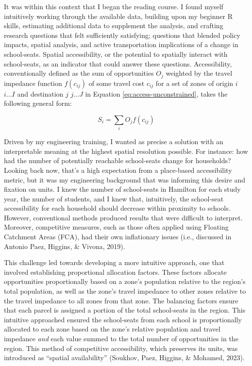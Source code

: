\documentclass[
11pt, %
oneside, %
english, %
singlespacing, %
]{macthesis} %
\begin{document}
It was within this context that I began the reading course. I found myself intuitively working through the available data, building upon my beginner R skills, estimating additional data to supplement the analysis, and crafting research questions that felt sufficiently satisfying; questions that blended policy impacts, spatial analysis, and active transportation implications of a change in school-seats. Spatial accessibility, or the potential to spatially interact with school-seats, as an indicator that could answer these questions. Accessibility, conventionally defined as the sum of opportunities \(O_j\) weighted by the travel impedance function \(f(c_{ij})\) of some travel cost \(c_{ij}\) for a set of zones of origin \(i\) \(i...I\) and destination \(j\) \(j...J\) in Equation \ref{eq:access-unconstrained}, takes the following general form:

\begin{equation}
\label{eq:access-unconstrained}
S_i = \sum_i O_j f(c_{ij}) 
\end{equation} 

Driven by my engineering training, I wanted as precise a solution with an interpretable meaning at the highest spatial resolution possible. For instance: how had the number of potentially reachable school-seats change for households? Looking back now, that's a high expectation from a place-based accessibility metric, but it was my engineering background that was informing this desire and fixation on units. I knew the number of school-seats in Hamilton for each study year, the number of students, and I knew that, intuitively, the school-seat accessibility for each household should decrease within proximity to schools. However, conventional methods produced results that were difficult to interpret. Moreover, competitive measures, such as those often applied using Floating Catchment Areas (FCA), had their own inflationary issues (i.e., discussed in Antonio Paez, Higgins, \& Vivona, 2019).

This challenge led towards developing a more intuitive approach, one that involved establishing proportional allocation factors. These factors allocate opportunities proportionally based on a zone's population relative to the region's total population, as well as the zone's travel impedance to other zones relative to the travel impedance to all zones from that zone. The balancing factors ensure that each parcel is assigned a portion of the total school-seats in the region. This intuitive approached ensured the school-seats from each school is proportionally allocated to each zone based on the zone's relative population and travel impedance \emph{and} each value summed to the total number of opportunities in the region. This method of competitive accessibility, which preserves its units, was introduced as ``spatial availability'' (Soukhov, Paez, Higgins, \& Mohamed, 2023).
\end{document}
